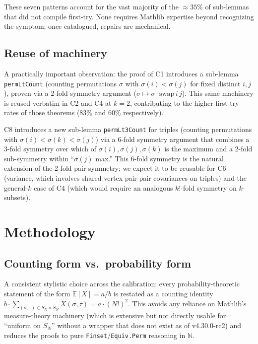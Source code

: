 \documentclass[11pt]{article}
\theoremstyle{definition}
\begin{document}
These seven patterns account for the vast majority of the $\approx 35\%$ of
sub-lemmas that did not compile first-try. None requires Mathlib expertise beyond
recognizing the symptom; once catalogued, repairs are mechanical.

\subsection{Reuse of machinery}

A practically important observation: the proof of C1 introduces a sub-lemma
\texttt{permLtCount} (counting permutations $\sigma$ with $\sigma(i) < \sigma(j)$
for fixed distinct $i, j$), proven via a 2-fold symmetry argument
($\sigma \mapsto \sigma \cdot \mathrm{swap}\,i\,j$). This same machinery is reused
verbatim in C2 and C4 at $k=2$, contributing to the higher first-try rates of those
theorems ($83\%$ and $60\%$ respectively).

C8 introduces a new sub-lemma \texttt{permLt3Count} for triples (counting
permutations with $\sigma(i) < \sigma(k) < \sigma(j)$) via a 6-fold symmetry
argument that combines a 3-fold symmetry over which of $\sigma(i), \sigma(j),
\sigma(k)$ is the maximum and a 2-fold sub-symmetry within ``$\sigma(j)$ max.''
This 6-fold symmetry is the natural extension of the 2-fold pair symmetry; we
expect it to be reusable for C6 (variance, which involves shared-vertex pair-pair
covariances on triples) and the general-$k$ case of C4 (which would require an
analogous $k!$-fold symmetry on $k$-subsets).

\section{Methodology}\label{sec:methodology}

\subsection{Counting form vs.\ probability form}

A consistent stylistic choice across the calibration: every probability-theoretic
statement of the form $\mathbb{E}[X] = a/b$ is restated as a counting identity
$b \cdot \sum_{(\sigma, \tau) \in S_N \times S_N} X(\sigma, \tau) = a \cdot
(N!)^2$. This avoids any reliance on Mathlib's measure-theory machinery (which is
extensive but not directly usable for ``uniform on $S_N$'' without a wrapper that
does not exist as of v4.30.0-rc2) and reduces the proofs to pure
\texttt{Finset}/\texttt{Equiv.Perm} reasoning in $\mathbb{N}$.
\end{document}
